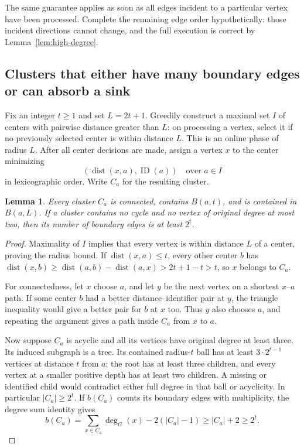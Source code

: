 \documentclass[11pt]{article}
\newtheorem{lemma}[theorem]{Lemma}
\theoremstyle{definition}
\newcommand{\dist}{\operatorname{dist}}
\begin{document}
The same guarantee applies as soon as all edges incident to a particular
vertex have been processed. Complete the remaining edge order
hypothetically: those incident directions cannot change, and the full
execution is correct by Lemma~\ref{lem:high-degree}.

\subsection{Clusters that either have many boundary edges or can absorb a sink}

Fix an integer $t\ge1$ and set $L=2t+1$. Greedily construct a maximal set
$I$ of centers with pairwise distance greater than $L$: on processing a
vertex, select it if no previously selected center is within distance $L$.
This is an online phase of radius $L$. After all center decisions are made,
assign a vertex $x$ to the center minimizing
\[
 (\dist(x,a),\operatorname{ID}(a))\quad\text{over }a\in I
\]
in lexicographic order. Write $C_a$ for the resulting cluster.

\begin{lemma}\label{lem:clusters}
Every cluster $C_a$ is connected, contains $B(a,t)$, and is contained in
$B(a,L)$. If a cluster contains no cycle and no vertex of original degree
at most two, then its number of boundary edges is at least $2^t$.
\end{lemma}
\begin{proof}
Maximality of $I$ implies that every vertex is within distance $L$ of a
center, proving the radius bound. If $\dist(x,a)\le t$, every other center
$b$ has
$\dist(x,b)\ge\dist(a,b)-\dist(a,x)>2t+1-t>t$,
so $x$ belongs to $C_a$.

For connectedness, let $x$ choose $a$, and let $y$ be the next vertex on a
shortest $x$--$a$ path. If some center $b$ had a better distance--identifier
pair at $y$, the triangle inequality would give a better pair for $b$ at
$x$ too. Thus $y$ also chooses $a$, and repeating the argument gives a
path inside $C_a$ from $x$ to $a$.

Now suppose $C_a$ is acyclic and all its vertices have original degree at
least three. Its induced subgraph is a tree. Its contained radius-$t$ ball
has at least $3\cdot2^{t-1}$ vertices at distance $t$ from $a$: the root
has at least three children, and every vertex at a smaller positive depth
has at least two children. A missing or identified child would contradict
either full degree in that ball or acyclicity. In particular
$|C_a|\ge2^t$. If $b(C_a)$ counts its boundary edges with multiplicity,
the degree sum identity gives
\[
 b(C_a)=\sum_{x\in C_a}\deg_G(x)-2(|C_a|-1)
 \ge |C_a|+2\ge2^t.
\]
\end{proof}
\end{document}
